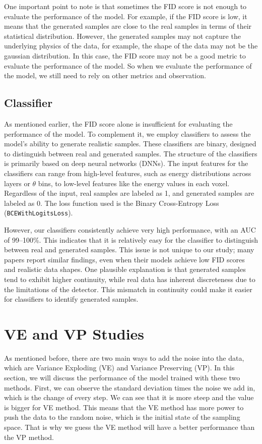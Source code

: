 One important point to note is that sometimes the FID score is not enough to evaluate the performance of the model. For example, if the FID score is low, it means that the generated samples are close to the real samples in terms of their statistical distribution. However, the generated samples may not capture the underlying physics of the data, for example, the shape of the data may not be the gaussian distribution. In this case, the FID score may not be a good metric to evaluate the performance of the model. So when we evaluate the performance of the model, we still need to rely on other metrics and observation.

\subsection{Classifier}

As mentioned earlier, the FID score alone is insufficient for evaluating the performance of the model. To complement it, we employ classifiers to assess the model's ability to generate realistic samples. These classifiers are binary, designed to distinguish between real and generated samples. The structure of the classifiers is primarily based on deep neural networks (DNNs). The input features for the classifiers can range from high-level features, such as energy distributions across layers or $\theta$ bins, to low-level features like the energy values in each voxel. Regardless of the input, real samples are labeled as 1, and generated samples are labeled as 0. The loss function used is the Binary Cross-Entropy Loss (\texttt{BCEWithLogitsLoss}).

However, our classifiers consistently achieve very high performance, with an AUC of 99--100\%. This indicates that it is relatively easy for the classifier to distinguish between real and generated samples. This issue is not unique to our study; many papers report similar findings, even when their models achieve low FID scores and realistic data shapes. One plausible explanation is that generated samples tend to exhibit higher continuity, while real data has inherent discreteness due to the limitations of the detector. This mismatch in continuity could make it easier for classifiers to identify generated samples.


\section{VE and VP Studies}
As mentioned before, there are two main ways to add the noise into the data, which are Variance Exploding (VE) and Variance Preserving (VP). In this section, we will discuss the performance of the model trained with these two methods. First, we can observe the standard deviation times the noise we add in, which is the change of every step. We can see that it is more steep and the value is bigger for VE method. This means that the VE method has more power to push the data to the random noise, which is the initial state of the sampling space. That is why we guess the VE method will have a better performance than the VP method.

